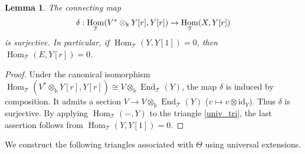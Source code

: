 \documentclass[a4paper,reqno,11pt]{amsart}
\numberwithin{equation}{section}
\newtheorem{lemma}[theorem]{Lemma}
\theoremstyle{definition}
\newcommand{\T}{\mathcal{T}}
\newcommand{\bte}{\Theta}
\newcommand{\kk}{\Bbbk}
\newcommand{\id}{\mathrm{id}}
\DeclareMathOperator{\End}{End}
\DeclareMathOperator{\Hom}{Hom}
\begin{document}
\begin{lemma}\label{lem:high_univ_ext}
The connecting map
\begin{align}
\delta:\Hom_{\T}(V^{\ast}\otimes_{\kk}Y[r],Y[r])
\to\Hom_{\T}(X,Y[r])\notag
\end{align}
is surjective. In particular, if $\Hom_{\T}(Y,Y[1])=0$, then $\Hom_{\T}(E,Y[r])=0$.
\end{lemma}
\begin{proof}
Under the canonical isomorphism $\Hom_{\T}(V^{\ast}\otimes_{\kk}Y[r],Y[r])\cong V\otimes_{\kk}\End_{\T}(Y)$, the map $\delta$ is induced by composition.
It admits a section $V\to V\otimes_{\kk}\End_{\T}(Y)$ ($v\mapsto v\otimes\id_{Y}$).
Thus $\delta$ is surjective.
By applying $\Hom_{\T}(-,Y)$ to the triangle \eqref{univ_tri}, the last assertion follows from $\Hom_{\T}(Y,Y[1])=0$.
\end{proof}

We construct the following triangles associated with $\bte$ using universal extensions.
\end{document}
